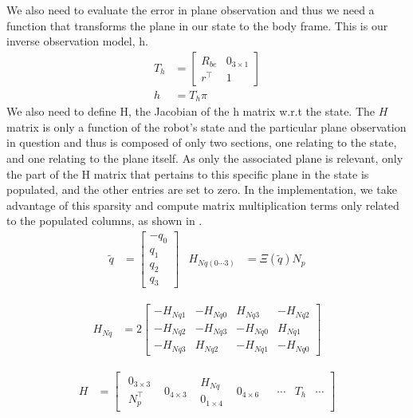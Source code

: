 \documentclass[]{article}
\begin{document}
{We also need to evaluate the error in plane observation and thus we need a function that transforms the plane in our state to the body frame. This is our inverse observation model, h.
\begin{align}
	T_h &= 
	\left[
	\begin{matrix}
		R_{be} 	& 0_{3\times1} \\
		r^\top 	& 1
	\end{matrix}
	\right]
	\\
	h &= T_h \pi
\end{align}
We also need to define H, the Jacobian of the h matrix w.r.t the state. The $H$ matrix is only a function of the robot's state and the particular plane observation in question and thus is composed of only two sections, one relating to the state, and one relating to the plane itself. As only the associated plane is relevant, only the part of the H matrix that pertains to this specific plane in the state is populated, and the other entries are set to zero.
In the implementation, we take advantage of this sparsity and compute matrix multiplication terms only related to the populated columns, as shown in \cite{Sola2013}.
\begin{align}
	\tilde{q} &= 
	\left[
	\begin{matrix}
		-q_0 \\
		q_1 \\
		q_2 \\
		q_3
	\end{matrix}
	\right]
	&
	H_{Nq(0\cdots3)} &= \Xi(\tilde{q}) N_p
\end{align}

\begin{align}
	H_{Nq} &= 2
	\left[
	\begin{matrix}
		-H_{Nq1} 	& -H_{Nq0} 	& H_{Nq3} 	& -H_{Nq2} \\
		-H_{Nq2} 	& -H_{Nq3} 	& -H_{Nq0} 	& H_{Nq1} \\
		-H_{Nq3} 	& H_{Nq2} 	& -H_{Nq1} 	& -H_{Nq0}
	\end{matrix}
	\right]
\end{align}

\begin{align}
	H &=
	\left[
	\begin{matrix}
		\begin{matrix}
			0_{3 \times 3} \\
			N_p^\top
		\end{matrix}
		& 0_{4 \times 3}
		&
		\begin{matrix}
			H_{Nq} \\
			0_{1 \times 4}
		\end{matrix}
		& 0_{4 \times 6}
		&
		& \cdots
		& T_h
		& \cdots
	\end{matrix}
	\right]
\end{align}

}
\end{document}
